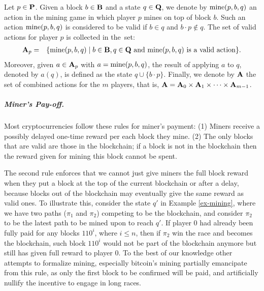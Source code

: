 Let $p \in \mathbf{P}$. Given a block $b \in \mathbf{B}$ and a state $q \in \mathbf{Q}$, we denote by $\text{\rm mine}(p,b,q)$ an action in the mining game in which player $p$ mines on top of block $b$. Such an action $\text{\rm mine}(p,b,q)$ is considered to be valid if $b \in q$ and $b\cdot p \not\in q$. The set of valid actions for player $p$ is collected in the~set:
\begin{eqnarray*}
\mathbf{A}_p & = & \{ \text{\rm mine}(p,b,q) \mid b \in \mathbf{B}, q \in \mathbf{Q} \text{ and } \text{\rm mine}(p,b,q) \text{ is a valid action}\}.
\end{eqnarray*}
Moreover, given $a \in \mathbf{A}_p$ with $a = \text{\rm mine}(p,b,q)$, the result of applying $a$ to $q$, denoted by $a(q)$, is defined as the state $q \cup \{b \cdot p\}$. Finally, we denote by $\mathbf{A}$ the set of combined actions for the $m$ players, that is, $\mathbf{A} = \mathbf{A}_0 \times \mathbf{A}_1 \times \cdots \times \mathbf{A}_{m-1}$.

\subparagraph*{Miner's Pay-off.}
Most cryptocurrencies follow these rules for miner's payment:
%
(1) Miners receive a possibly delayed one-time reward per each block they mine. %
%
(2) The only blocks that are valid are those in the blockchain; if a block is not in the blockchain then the reward given for mining this block cannot be spent. 

The second rule enforces that we cannot just give miners the full block reward when they put a block at the top of the current blockchain or after a delay, because blocks out of the blockchain may eventually give the same reward as valid ones. To illustrate this, consider the state $q'$ in Example \ref{ex-mining}, where we have two paths ($\pi_1$ and $\pi_2$) competing to be the blockchain, and consider $\pi_2$ to be the latest path to be mined upon to reach $q'$. If player $0$ had already been fully paid for any blocks $110^i$, where $i \leq n$, then if $\pi_2$ win the race and becomes the blockchain, such block $110^i$ would not be part of the blockchain anymore but still has given full reward to player $0$. To the best of our knowledge other attempts to formalize mining, especially bitcoin's mining partially emancipate from this rule, as only the first block to be confirmed will be paid, and artificially nullify the incentive to engage in long races.

